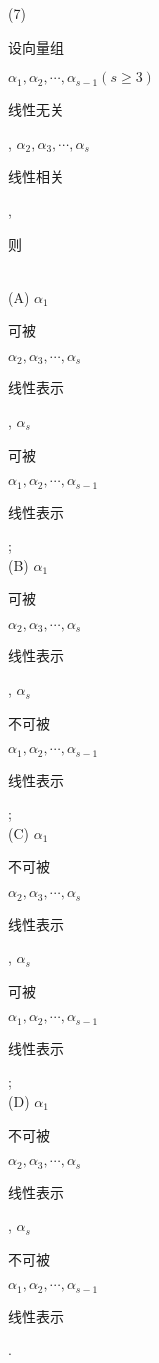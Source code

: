 \documentclass[10pt]{article}
\begin{document}
(7) \begin{CJK}{UTF8}{mj}设向量组\end{CJK} $\alpha_{1}, \alpha_{2}, \cdots, \alpha_{s-1}(s \geqslant 3)$ \begin{CJK}{UTF8}{mj}线性无关\end{CJK}, $\alpha_{2}, \alpha_{3}, \cdots, \alpha_{s}$ \begin{CJK}{UTF8}{mj}线性相关\end{CJK}, \begin{CJK}{UTF8}{mj}则\end{CJK}\\
(A) $\alpha_{1}$ \begin{CJK}{UTF8}{mj}可被\end{CJK} $\alpha_{2}, \alpha_{3}, \cdots, \alpha_{s}$ \begin{CJK}{UTF8}{mj}线性表示\end{CJK}, $\alpha_{s}$ \begin{CJK}{UTF8}{mj}可被\end{CJK} $\alpha_{1}, \alpha_{2}, \cdots, \alpha_{s-1}$ \begin{CJK}{UTF8}{mj}线性表示\end{CJK};\\
(B) $\alpha_{1}$ \begin{CJK}{UTF8}{mj}可被\end{CJK} $\alpha_{2}, \alpha_{3}, \cdots, \alpha_{s}$ \begin{CJK}{UTF8}{mj}线性表示\end{CJK}, $\alpha_{s}$ \begin{CJK}{UTF8}{mj}不可被\end{CJK} $\alpha_{1}, \alpha_{2}, \cdots, \alpha_{s-1}$ \begin{CJK}{UTF8}{mj}线性表示\end{CJK};\\
(C) $\alpha_{1}$ \begin{CJK}{UTF8}{mj}不可被\end{CJK} $\alpha_{2}, \alpha_{3}, \cdots, \alpha_{s}$ \begin{CJK}{UTF8}{mj}线性表示\end{CJK}, $\alpha_{s}$ \begin{CJK}{UTF8}{mj}可被\end{CJK} $\alpha_{1}, \alpha_{2}, \cdots, \alpha_{s-1}$ \begin{CJK}{UTF8}{mj}线性表示\end{CJK};\\
(D) $\alpha_{1}$ \begin{CJK}{UTF8}{mj}不可被\end{CJK} $\alpha_{2}, \alpha_{3}, \cdots, \alpha_{s}$ \begin{CJK}{UTF8}{mj}线性表示\end{CJK}, $\alpha_{s}$ \begin{CJK}{UTF8}{mj}不可被\end{CJK} $\alpha_{1}, \alpha_{2}, \cdots, \alpha_{s-1}$ \begin{CJK}{UTF8}{mj}线性表示\end{CJK}.
\end{document}
